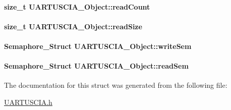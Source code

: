 \paragraph[{read\-Count}]{\setlength{\rightskip}{0pt plus 5cm}size\-\_\-t U\-A\-R\-T\-U\-S\-C\-I\-A\-\_\-\-Object\-::read\-Count}\label{struct_u_a_r_t_u_s_c_i_a___object_adb1e69a9b2ef8037b082d47f84cdabe5}
\paragraph[{read\-Size}]{\setlength{\rightskip}{0pt plus 5cm}size\-\_\-t U\-A\-R\-T\-U\-S\-C\-I\-A\-\_\-\-Object\-::read\-Size}\label{struct_u_a_r_t_u_s_c_i_a___object_a090e54b299cba93e4ae8494081c9cb1d}
\paragraph[{write\-Sem}]{\setlength{\rightskip}{0pt plus 5cm}Semaphore\-\_\-\-Struct U\-A\-R\-T\-U\-S\-C\-I\-A\-\_\-\-Object\-::write\-Sem}\label{struct_u_a_r_t_u_s_c_i_a___object_a5c99cc071d0e9d71c329147a65dcc95e}
\paragraph[{read\-Sem}]{\setlength{\rightskip}{0pt plus 5cm}Semaphore\-\_\-\-Struct U\-A\-R\-T\-U\-S\-C\-I\-A\-\_\-\-Object\-::read\-Sem}\label{struct_u_a_r_t_u_s_c_i_a___object_a7f88d31f755309e5b48fc2b5256db1ad}


The documentation for this struct was generated from the following file\-:\begin{DoxyCompactItemize}
\item 
\hyperlink{_u_a_r_t_u_s_c_i_a_8h}{U\-A\-R\-T\-U\-S\-C\-I\-A.\-h}\end{DoxyCompactItemize}
